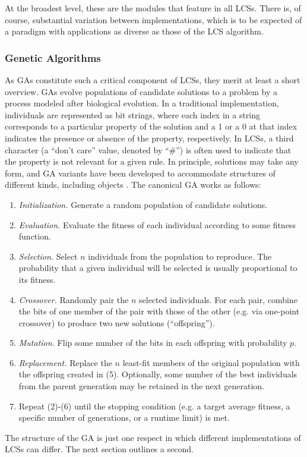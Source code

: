 \documentclass[12pt,twoside]{article}
\begin{document}
At the broadest level, these are the modules that feature in all LCSs. There is, of course, substantial variation between implementations, which is to be expected of a paradigm with applications as diverse as those of the LCS algorithm.

\subsubsection{Genetic Algorithms}

As GAs constitute such a critical component of LCSs, they merit at least a short overview. GAs evolve populations of candidate solutions to a problem by a process modeled after biological evolution. In a traditional implementation, individuals are represented as bit strings, where each index in a string corresponds to a particular property of the solution and a 1 or a 0 at that index indicates the presence or absence of the property, respectively. In LCSs, a third character (a ``don't care'' value, denoted by ``\#'') is often used to indicate that the property is not relevant for a given rule. In principle, solutions may take any form, and GA variants have been developed to accommodate structures of different kinds, including objects \cite{keijzer_evolving_2001}. The canonical GA works as follows:
\begin{enumerate}
\item \emph{Initialization.} Generate a random population of candidate solutions.
\item \emph{Evaluation.} Evaluate the fitness of each individual according to some fitness function.
\item \emph{Selection.} Select $n$ individuals from the population to reproduce. The probability that a given individual will be selected is usually proportional to its fitness.
\item \emph{Crossover.} Randomly pair the $n$ selected individuals. For each pair, combine the bits of one member of the pair with those of the other (e.g. via one-point crossover) to produce two new solutions (``offspring'').
\item \emph{Mutation.} Flip some number of the bits in each offspring with probability $p$.
\item \emph{Replacement.} Replace the $n$ least-fit members of the original population with the offspring created in (5). Optionally, some number of the best individuals from the parent generation may be retained in the next generation.
\item Repeat (2)-(6) until the stopping condition (e.g. a target average fitness, a specific number of generations, or a runtime limit) is met.
\end{enumerate}
The structure of the GA is just one respect in which different implementations of LCSs can differ. The next section outlines a second.
\end{document}
